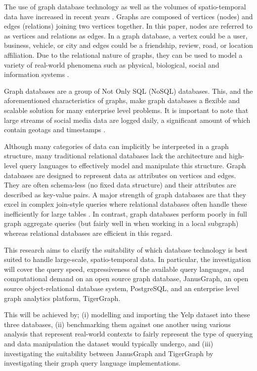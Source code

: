 The use of graph database technology as well as the volumes of spatio-temporal data have increased in recent years \cite{mongovspostgres}. Graphs are composed of vertices (nodes) and edges (relations) joining two vertices together. In this paper, nodes are referred to as vertices and relations as edges. In a graph database, a vertex could be a user, business, vehicle, or city and edges could be a friendship, review, road, or location affiliation. Due to the relational nature of graphs, they can be used to model a variety of real-world phenomena such as physical, biological, social and information systems \cite{socialdata}.

Graph databases are a group of Not Only SQL (NoSQL) databases. This, and the aforementioned characteristics of graphs, make graph databases a flexible and scalable solution for many enterprise level problems. It is important to note that large streams of social media data are logged daily, a significant amount of which contain geotags and timestamps \cite{twitterdata}.

Although many categories of data can implicitly be interpreted in a graph structure, many traditional relational databases lack the architecture and high-level query languages to effectively model and manipulate this structure. Graph databases are designed to represent data as attributes on vertices and edges. They are often schema-less (no fixed data structure) and their attributes are described as key-value pairs. A major strength of graph databases are that they excel in complex join-style queries where relational databases often handle these inefficiently for large tables \cite{data-in-nosql}. In contrast, graph databases perform poorly in full graph aggregate queries (but fairly well in when working in a local subgraph) whereas relational databases are efficient in this regard.

This research aims to clarify the suitability of which database technology is best suited to handle large-scale, spatio-temporal data. In particular, the investigation will cover the query speed, expressiveness of the available query languages, and computational demand on an open source graph database, JanusGraph, an open source object-relational database system, PostgreSQL, and an enterprise level graph analytics platform, TigerGraph. 

This will be achieved by; (i) modelling and importing the Yelp dataset \cite{yelpdataset}  into these three databases, (ii) benchmarking them against one another using various analysis that represent real-world contexts to fairly represent the type of querying and data manipulation the dataset would typically undergo, and (iii) investigating the suitability between JanusGraph and TigerGraph by investigating their graph query language implementations.
